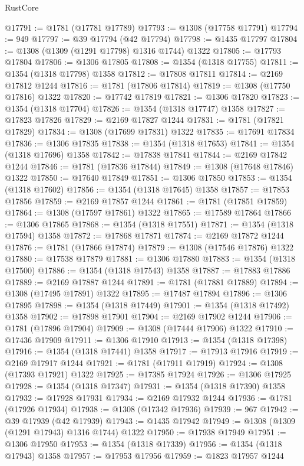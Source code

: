 \begin{lexlean}{RustCore}
\begin{coremodule}
@17791 := @1781 (@17781 @17789)
@17793 := @1308 (@17758 @17791)
@17794 := 949
@17797 := @39 @17794 (@42 @17794)
@17798 := @1435 @17797
@17804 := @1308 (@1309 (@1291 @17798) @1316 @1744) @1322
@17805 := @17793 @17804
@17806 := @1306 @17805
@17808 := @1354 (@1318 @17755)
@17811 := @1354 (@1318 @17798) @1358
@17812 := @17808 @17811
@17814 := @2169 @17812 @1244
@17816 := @1781 (@17806 @17814)
@17819 := @1308 (@17750 @17816) @1322
@17820 := @17742 @17819
@17821 := @1306 @17820
@17823 := @1354 (@1318 @17704)
@17826 := @1354 (@1318 @17747) @1358
@17827 := @17823 @17826
@17829 := @2169 @17827 @1244
@17831 := @1781 (@17821 @17829)
@17834 := @1308 (@17699 @17831) @1322
@17835 := @17691 @17834
@17836 := @1306 @17835
@17838 := @1354 (@1318 @17653)
@17841 := @1354 (@1318 @17696) @1358
@17842 := @17838 @17841
@17844 := @2169 @17842 @1244
@17846 := @1781 (@17836 @17844)
@17849 := @1308 (@17648 @17846) @1322
@17850 := @17640 @17849
@17851 := @1306 @17850
@17853 := @1354 (@1318 @17602)
@17856 := @1354 (@1318 @17645) @1358
@17857 := @17853 @17856
@17859 := @2169 @17857 @1244
@17861 := @1781 (@17851 @17859)
@17864 := @1308 (@17597 @17861) @1322
@17865 := @17589 @17864
@17866 := @1306 @17865
@17868 := @1354 (@1318 @17551)
@17871 := @1354 (@1318 @17594) @1358
@17872 := @17868 @17871
@17874 := @2169 @17872 @1244
@17876 := @1781 (@17866 @17874)
@17879 := @1308 (@17546 @17876) @1322
@17880 := @17538 @17879
@17881 := @1306 @17880
@17883 := @1354 (@1318 @17500)
@17886 := @1354 (@1318 @17543) @1358
@17887 := @17883 @17886
@17889 := @2169 @17887 @1244
@17891 := @1781 (@17881 @17889)
@17894 := @1308 (@17495 @17891) @1322
@17895 := @17487 @17894
@17896 := @1306 @17895
@17898 := @1354 (@1318 @17449)
@17901 := @1354 (@1318 @17492) @1358
@17902 := @17898 @17901
@17904 := @2169 @17902 @1244
@17906 := @1781 (@17896 @17904)
@17909 := @1308 (@17444 @17906) @1322
@17910 := @17436 @17909
@17911 := @1306 @17910
@17913 := @1354 (@1318 @17398)
@17916 := @1354 (@1318 @17441) @1358
@17917 := @17913 @17916
@17919 := @2169 @17917 @1244
@17921 := @1781 (@17911 @17919)
@17924 := @1308 (@17393 @17921) @1322
@17925 := @17385 @17924
@17926 := @1306 @17925
@17928 := @1354 (@1318 @17347)
@17931 := @1354 (@1318 @17390) @1358
@17932 := @17928 @17931
@17934 := @2169 @17932 @1244
@17936 := @1781 (@17926 @17934)
@17938 := @1308 (@17342 @17936)
@17939 := 967
@17942 := @39 @17939 (@42 @17939)
@17943 := @1435 @17942
@17949 := @1308 (@1309 (@1291 @17943) @1316 @1744) @1322
@17950 := @17938 @17949
@17951 := @1306 @17950
@17953 := @1354 (@1318 @17339)
@17956 := @1354 (@1318 @17943) @1358
@17957 := @17953 @17956
@17959 := @1823 @17957 @1244

\end{coremodule}
\end{lexlean}
